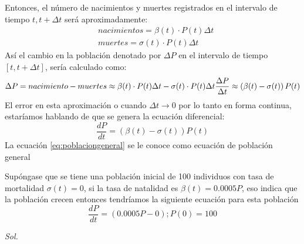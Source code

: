 Entonces, el número de nacimientos y muertes registrados en el intervalo de tiempo $t,t+\Delta t$ será aproximadamente:
\begin{align*}
    &nacimientos=\beta(t)\cdot P(t)\Delta t\\
    &muertes=\sigma(t)\cdot P(t)\Delta t
\end{align*}
Así el cambio en la población denotado por $\Delta P$ en el intervalo de tiempo $\left[t,t+\Delta t\right]$, sería calculado como: 
\begin{equation*}
    \Delta P=nacimiento-muertes\approx\beta(t)\cdot P(t)\Delta t-\sigma(t)\cdot P(t)\Delta t\\
\frac{\Delta P}{\Delta t}\approx \left(\beta(t)-\sigma(t)\right)P(t)
\end{equation*}
El error en esta aproximación o cuando $\Delta t\to 0$ por lo tanto en forma continua, estaríamos hablando de que se genera la ecuación diferencial:
\begin{equation}
    \frac{dP}{dt}=\left(\beta(t)-\sigma(t)\right)P(t)
    \label{eq:poblaciongeneral}
\end{equation}
La ecuación \eqref{eq:poblaciongeneral} se le conoce como ecuación de población general

\begin{example}
    Supóngase que se tiene una población inicial de 100 individuos con tasa de mortalidad $\sigma(t)=0$, si la tasa de natalidad es $\beta(t)=0.0005P$, eso indica que la población crecen entonces tendríamos la siguiente ecuación para esta población
    \begin{equation*}
        \frac{dP}{dt}=(0.0005P-0); P(0)=100
    \end{equation*}
\end{example}
\textit{ Sol. }

